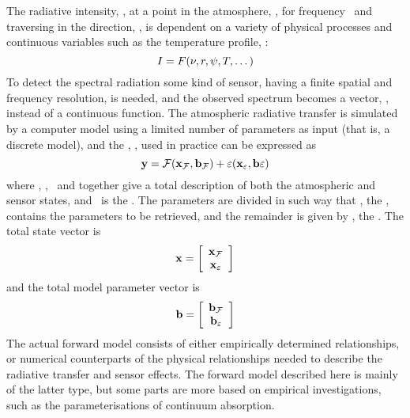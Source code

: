  The radiative intensity, \Mpi, at a point in the atmosphere, \Rds, for
 frequency \Frq\ and traversing in the direction, \ZntAng, is dependent
 on a variety of physical processes and continuous variables such as
 the temperature profile, \Tmp:
 \begin{equation}
   I = F(\nu,r,\psi,T,\dots)
 \end{equation} 
 To detect the spectral radiation some kind of sensor, having a finite
 spatial and frequency resolution, is needed, and the observed
 spectrum becomes a vector, \MsrVct, instead of a continuous function.
 The atmospheric radiative transfer is simulated by a computer model
 using a limited number of parameters as input (that is, a discrete
 model), and the , \FrwMdl, used in practice can
 be expressed as
 \begin{equation}
   \mathbf{y} = \mathcal{F}(\mathbf{x}_{\mathcal{F}},\mathbf{b}_{\mathcal{F}}) + 
                      \varepsilon(\mathbf{x}_{\varepsilon},\mathbf{b}{\varepsilon})
  \label{eq:formalism:fm}
 \end{equation}
 where \aSttVct{\FrwMdl}, \aFrwMdlVct{\FrwMdl}, \aSttVct{\MsrErrVct}\ 
 and \aFrwMdlVct{\MsrErrVct} together give a total description of both
 the atmospheric and sensor states, and \MsrErrVct\ is the
 . The parameters are divided in such way
 that \SttVct, the \textindex{state vector}, contains the parameters to
 be retrieved, and the remainder is given by \FrwMdlVct, the
 . The total state vector is
 \begin{equation}
   \mathbf{x} = \left[ \begin{array}{c} \mathbf{x}_{\mathcal{F}} \\ 
                                     \mathbf{x}_{\varepsilon} \end{array} \right]
 \end{equation}
 and the total model parameter vector is
 \begin{equation}
   \mathbf{b} = \left[ \begin{array}{c} \mathbf{b}_{\mathcal{F}} \\ 
                                    \mathbf{b}_{\varepsilon} \end{array} \right]
 \end{equation}
 The actual forward model consists of either empirically determined
 relationships, or numerical counterparts of the physical
 relationships needed to describe the radiative transfer and sensor
 effects. The forward model described here is mainly of the latter
 type, but some parts are more based on empirical investigations, such
 as the parameterisations of continuum absorption. 
  
